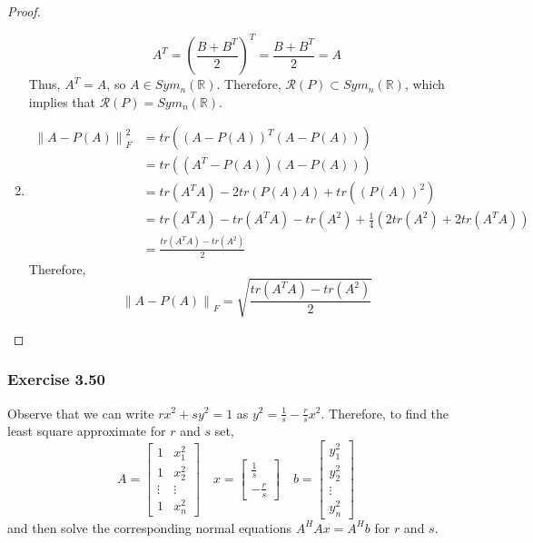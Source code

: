 \documentclass[letterpaper,12pt]{article}
\theoremstyle{definition}
\newcommand{\norm}[1]{\left\lVert#1\right\rVert}
\begin{document}
\begin{proof}
\begin{enumerate}
		\begin{equation}
		A^T = \left(\frac{B + B^T}{2}\right)^T = \frac{B + B^T}{2} = A
		\end{equation}
		Thus, $A^T = A$, so $A \in Sym_n(\mathbb{R})$. Therefore,  $\mathscr{R}(P) \subset Sym_n(\mathbb{R})$, which implies that $\mathscr{R}(P) = Sym_n(\mathbb{R})$.
		\item 
		\begin{align*}
		\norm{A-P(A)}^2_F &= tr((A-P(A))^T(A - P(A))) \\
		&= tr((A^T - P(A))(A - P(A))) \\
		&= tr(A^TA) - 2tr(P(A)A) + tr((P(A))^2) \\
		&= tr(A^TA) - tr(A^TA) - tr(A^2) + \frac{1}{4}(2tr(A^2) + 2tr(A^TA)) \\
		&= \frac{tr(A^TA) - tr(A^2)}{2}
		\end{align*}
		Therefore, 
		\begin{equation}
			\norm{A-P(A)}_F = \sqrt{\frac{tr(A^TA) - tr(A^2)}{2}}
		\end{equation}
	\end{enumerate}
	
\end{proof}

\subsubsection*{Exercise 3.50}
Observe that we can write $rx^2 + sy^2 = 1$ as $y^2 = \frac{1}{s} - \frac{r}{s} x^2$. Therefore, to find the least square approximate for  $r$ and $s$ set,
\begin{equation}
	A = 
	\begin{bmatrix}
	1 & x^2_1 \\
	1 & x^2_2 \\
	\vdots & \vdots \\
	1 & x^2_n 
	\end{bmatrix} 	
	\quad 
	x = 
	\begin{bmatrix}
	\frac{1}{s} \\
	-\frac{r}{s}
	\end{bmatrix}
	\quad 
	b = 
	\begin{bmatrix}
	y^2_1 \\
	y^2_2 \\
	\vdots \\
	y^2_n
	\end{bmatrix}
\end{equation}
and then solve the corresponding normal equations $A^HAx = A^Hb$ for $r$ and $s$.
\end{document}
